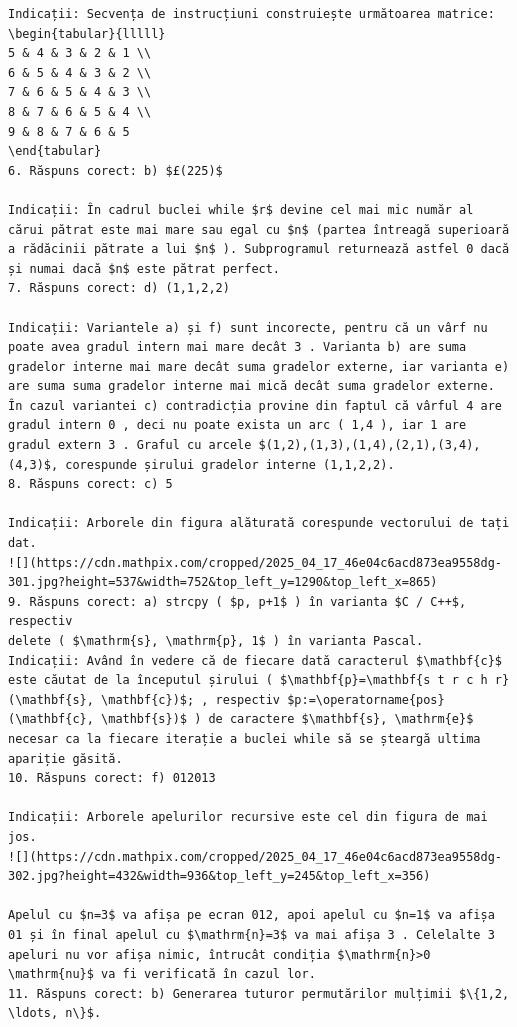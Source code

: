 \documentclass[10pt]{article}
\begin{document}
\begin{verbatim}
Indicații: Secvența de instrucțiuni construiește următoarea matrice:
\begin{tabular}{lllll}
5 & 4 & 3 & 2 & 1 \\
6 & 5 & 4 & 3 & 2 \\
7 & 6 & 5 & 4 & 3 \\
8 & 7 & 6 & 5 & 4 \\
9 & 8 & 7 & 6 & 5
\end{tabular}
6. Răspuns corect: b) $£(225)$

Indicații: În cadrul buclei while $r$ devine cel mai mic număr al cărui pătrat este mai mare sau egal cu $n$ (partea întreagă superioară a rădăcinii pătrate a lui $n$ ). Subprogramul returnează astfel 0 dacă și numai dacă $n$ este pătrat perfect.
7. Răspuns corect: d) (1,1,2,2)

Indicații: Variantele a) și f) sunt incorecte, pentru că un vârf nu poate avea gradul intern mai mare decât 3 . Varianta b) are suma gradelor interne mai mare decât suma gradelor externe, iar varianta e) are suma suma gradelor interne mai mică decât suma gradelor externe. În cazul variantei c) contradicția provine din faptul că vârful 4 are gradul intern 0 , deci nu poate exista un arc ( 1,4 ), iar 1 are gradul extern 3 . Graful cu arcele $(1,2),(1,3),(1,4),(2,1),(3,4),(4,3)$, corespunde șirului gradelor interne (1,1,2,2).
8. Răspuns corect: c) 5

Indicații: Arborele din figura alăturată corespunde vectorului de tați dat.
![](https://cdn.mathpix.com/cropped/2025_04_17_46e04c6acd873ea9558dg-301.jpg?height=537&width=752&top_left_y=1290&top_left_x=865)
9. Răspuns corect: a) strcpy ( $p, p+1$ ) în varianta $C / C++$, respectiv
delete ( $\mathrm{s}, \mathrm{p}, 1$ ) în varianta Pascal.
Indicații: Având în vedere că de fiecare dată caracterul $\mathbf{c}$ este căutat de la începutul șirului ( $\mathbf{p}=\mathbf{s t r c h r}(\mathbf{s}, \mathbf{c})$; , respectiv $p:=\operatorname{pos}(\mathbf{c}, \mathbf{s})$ ) de caractere $\mathbf{s}, \mathrm{e}$ necesar ca la fiecare iterație a buclei while să se șteargă ultima apariție găsită.
10. Răspuns corect: f) 012013

Indicații: Arborele apelurilor recursive este cel din figura de mai jos.
![](https://cdn.mathpix.com/cropped/2025_04_17_46e04c6acd873ea9558dg-302.jpg?height=432&width=936&top_left_y=245&top_left_x=356)

Apelul cu $n=3$ va afișa pe ecran 012, apoi apelul cu $n=1$ va afișa 01 și în final apelul cu $\mathrm{n}=3$ va mai afișa 3 . Celelalte 3 apeluri nu vor afișa nimic, întrucât condiția $\mathrm{n}>0 \mathrm{nu}$ va fi verificată în cazul lor.
11. Răspuns corect: b) Generarea tuturor permutărilor mulțimii $\{1,2, \ldots, n\}$.


\end{verbatim}
\end{document}
